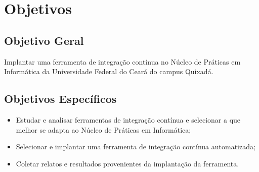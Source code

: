 \chapter{Objetivos}\label{objetivos}
\section{Objetivo Geral}\label{objetivoger}
Implantar uma ferramenta de integração contínua no Núcleo de Práticas em Informática da Universidade Federal do Ceará do campus Quixadá.

\section{Objetivos Específicos}

\begin{itemize}
\item Estudar e analisar ferramentas de integração contínua e selecionar a que melhor se adapta ao Núcleo de Práticas em Informática;
\item Selecionar e implantar uma ferramenta de integração contínua automatizada;
\item Coletar relatos e resultados provenientes da implantação da ferramenta.
\end{itemize}